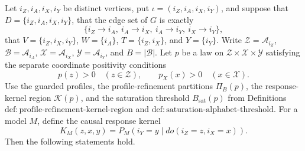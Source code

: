 Let \(i_Z,i_A,i_X,i_Y\) be distinct vertices, put
\(\iota=(i_Z,i_A,i_X,i_Y)\), and suppose that
\(D=\{i_Z,i_A,i_X,i_Y\}\), that the edge set of \(G\) is exactly
\[
 \{i_Z\mathbin{\to}i_A,\ i_A\mathbin{\to}i_X,
   \ i_A\mathbin{\to}i_Y,\ i_X\mathbin{\to}i_Y\},
\]
that \(V=\{i_Z,i_X,i_Y\}\), \(W=\{i_A\}\),
\(T=\{i_Z,i_X\}\), and \(Y=\{i_Y\}\).  Write
\(\mathcal Z=\mathcal A_{i_Z}\), \(\mathcal B=\mathcal A_{i_A}\),
\(\mathcal X=\mathcal A_{i_X}\), \(\mathcal Y=\mathcal A_{i_Y}\),
and \(B=\lvert\mathcal B\rvert\).  Let \(p\) be a law on
\(\mathcal Z\times\mathcal X\times\mathcal Y\) satisfying the separate
coordinate positivity conditions
\[
 p(z)>0\quad(z\in\mathcal Z),
 \qquad p_X(x)>0\quad(x\in\mathcal X).
\]
Use the guarded profiles, the profile-refinement partitions
\(\Pi_B(p)\), the response-kernel region \(\mathcal K(p)\), and the
saturation threshold \(B_{\mathrm{sat}}(p)\) from Definitions
\(\mathrm{def:profile\text{-}refinement\text{-}kernel\text{-}region}\)
and \(\mathrm{def:saturation\text{-}alphabet\text{-}threshold}\).  For a
model \(M\), define the causal response kernel
\[
 K_M(z,x,y)=P_M(i_Y=y\mid do(i_Z=z,i_X=x)).
\]
Then the following statements hold.
